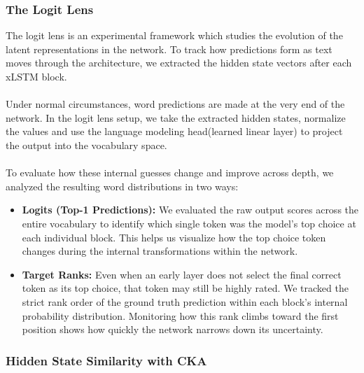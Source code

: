\subsubsection{The Logit Lens}
The logit lens\cite{nostalgebraist2020logitlens}\cite{belrose2023tunedlens} is an experimental framework
which studies the evolution of the latent representations in the network. To track how predictions form as 
text moves through the architecture, we extracted the hidden state vectors after each xLSTM block. \\ \\ 
%
Under normal circumstances, word predictions are made at the very end of the network. In the logit lens setup, 
we take the extracted hidden states, normalize the values and use the language modeling head(learned linear layer) 
to project the output into the vocabulary space. \\ \\ 
%
To evaluate how these internal guesses change and improve across depth, we analyzed the resulting word 
distributions in two ways:
\begin{itemize}
    \item \textbf{Logits (Top-1 Predictions):} We evaluated the raw output scores across the entire
    vocabulary to identify which single token was the model's top choice at each individual block. 
    This helps us visualize how the top choice token changes during the internal transformations within the network.
    \item \textbf{Target Ranks:} Even when an early layer does not select the final correct token as 
    its top choice, that token may still be highly rated. We tracked the strict rank
    order of the ground truth prediction within each block's internal probability distribution. 
    Monitoring how this rank climbs toward the first position shows how quickly the network narrows 
    down its uncertainty.
\end{itemize}

\subsubsection{Hidden State Similarity with CKA}


